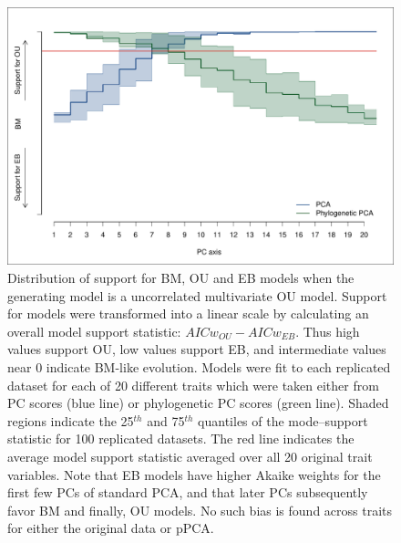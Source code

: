 \documentclass[a4paper,11pt]{article}
\begin{document}
\begin{figure}[p]
\centering
\includegraphics[scale=0.65]{./fig/uncor-ou-aic.pdf}
\caption{Distribution of support for BM, OU and EB models when the generating model is a uncorrelated multivariate OU model. Support for models were transformed into a linear scale by calculating an overall model support statistic: $AICw_{OU} - AICw_{EB}$. Thus high values support OU, low values support EB, and intermediate values near 0 indicate BM-like evolution. Models were fit to each replicated dataset for each of 20 different traits which were taken either from PC scores (blue line) or phylogenetic PC scores (green line). Shaded regions indicate the 25$^{th}$ and 75$^{th}$ quantiles of the mode--support statistic for 100 replicated datasets. The red line indicates the average model support statistic averaged over all 20 original trait variables. Note that EB models have higher Akaike weights for the first few PCs of standard PCA, and that later PCs subsequently favor BM and finally, OU models. No such bias is found across traits for either the original data or pPCA.}
\label{oufit}
\end{figure}
\end{document}
